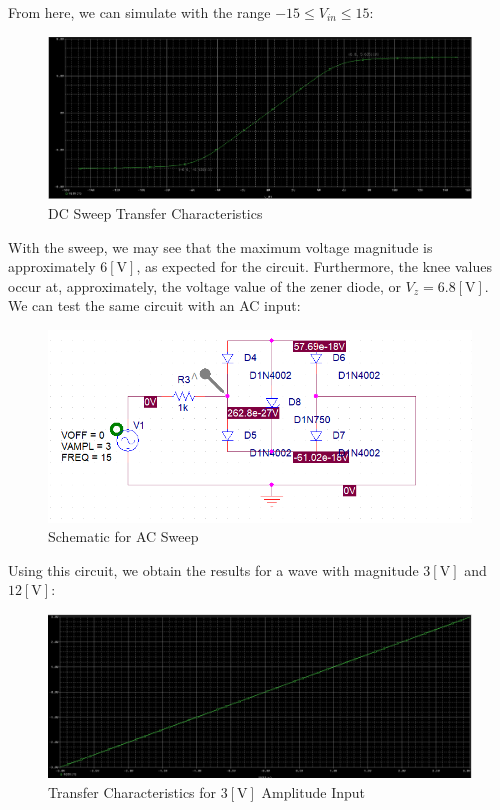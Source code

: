 \begin{enumerate}
    From here, we can simulate with the range $-15\leq V_{in}\leq 15$:

    \begin{figure}[H]
      \centering
      \includegraphics[width=.9\textwidth]{Figures/HW4-5b}
      \caption{DC Sweep Transfer Characteristics}
      \label{fig:12}
    \end{figure}

    With the sweep, we may see that the maximum voltage magnitude is approximately $6[\si{\volt}]$, as expected for the circuit. Furthermore, the knee values occur at, approximately, the voltage value of the zener diode, or $V_{z}=6.8[\si{\volt}]$. We can test the same circuit with an AC input:

    \begin{figure}[H]
      \centering
      \includegraphics[width=.9\textwidth]{Figures/HW4-5c}
      \caption{Schematic for AC Sweep}
      \label{fig:13}
    \end{figure}

    Using this circuit, we obtain the results for a wave with magnitude $3[\si{\volt}]$ and $12[\si{\volt}]$:

    \begin{figure}[H]
      \centering
      \includegraphics[width=.85\textwidth]{Figures/HW4-5d}
      \caption{Transfer Characteristics for $3[\si{\volt}]$ Amplitude Input}
      \label{fig:14}
    \end{figure}


\end{enumerate}
